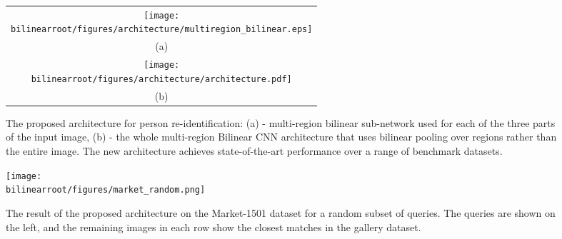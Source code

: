 

\begin{figure*}
\begin{center}
    

\begin{tabular}{c}
 
    
            \texttt{[image: \\bilinearroot/figures/architecture/multiregion\_bilinear.eps]}\\
    (a)\\
            \texttt{[image: \\bilinearroot/figures/architecture/architecture.pdf]}
            \\
    (b)\\
   
 \end{tabular}
        \caption{The proposed architecture for person re-identification: (a) - multi-region bilinear sub-network used for each of the three parts of the input image, (b) - the whole multi-region Bilinear CNN architecture that uses bilinear pooling over regions rather than the entire image. The new architecture achieves state-of-the-art performance over a range of benchmark datasets.}
        \label{fig:architecture}
    \end{center}
\end{figure*}

%



\begin{figure}
\texttt{[image: \\bilinearroot/figures/market\_random.png]}
\caption{The result of the proposed architecture on the Market-1501 dataset for a random subset of queries. The queries are shown on the left, and the remaining images in each row show the closest matches in the gallery dataset.}
\label{fig:market_retrieval}
\end{figure}



